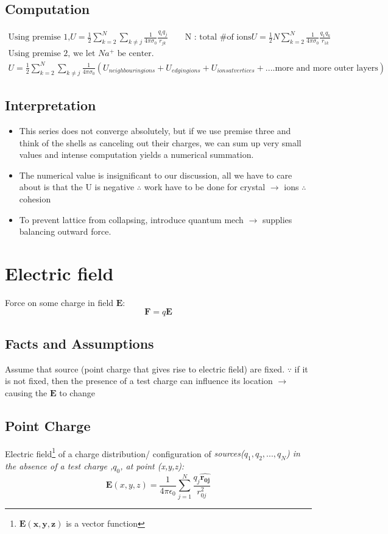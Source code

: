 \documentclass[12 pt , twoside, letterpaper] {article}
\renewcommand{\vec}[1]{\mathbf{#1}}
\let\oldhat\hat
\renewcommand{\hat}[1]{\oldhat{\mathbf{#1}}}
\begin{document}
\subsection{Computation}\begin{align*}
\text{Using premise 1,}U=\frac{1}{2} \sum^{N}_{k=2} \sum_{k \neq j} \frac{1}{4 \pi \sigma_0} \frac{q_i q_j}{r_{jk}}  \quad \quad \text{N : total \# of ions}
U=\frac{1}{2} N \sum^{N}_{k=2}  \frac{1}{4 \pi \sigma_0} \frac{q_1 q_k}{r_{1k}}
\\ \text{Using premise 2, we let $Na^+$ be center.}
\\U=\frac{1}{2} \sum^{N}_{k=2} \sum_{k \neq j} \frac{1}{4 \pi \sigma_0} (U_{neighbouring ions} + U_{edging ions}+ U_{ions at vertices}+....\text{more and more outer layers}) 
\end{align*}
\subsection{Interpretation}
\begin{itemize}
\item This series does not converge absolutely, but if we use premise three and think of the shells as canceling out their charges, we can sum up very small values and intense computation yields a numerical summation.
\item The numerical value is insignificant to our discussion, all we have to care about is that the U is negative $\therefore$ work have to be done for crystal $\rightarrow$ ions $\therefore$ cohesion
\item To prevent lattice from collapsing, introduce quantum mech $\rightarrow$ supplies balancing outward force.
\end{itemize}
\section{Electric field}
Force on some charge in field $\vec{E}$:
$$\vec{F}=q \vec {E}$$

\subsection{Facts and Assumptions}
Assume that source (point charge that gives rise to electric field) are fixed. $\because$ if it is not fixed, then the presence of a test charge can influence its location $\rightarrow$ causing the $\vec E $ to change 

\subsection{Point Charge}
Electric field\footnote{$\vec{E(x,y,z)}$ is a vector function} of a charge distribution/ configuration of \it sources\rm ($ q_1,q_2,...,q_N$) in the absence of a test charge ,$q_0$, at point (x,y,z):
$$ \vec {E} (x,y,z)= \frac {1} {4 \pi \epsilon_0} \sum^{N}_{j=1} \frac{q_j \hat {r_{0j}}}{r_{0j}^2}$$
\end{document}
